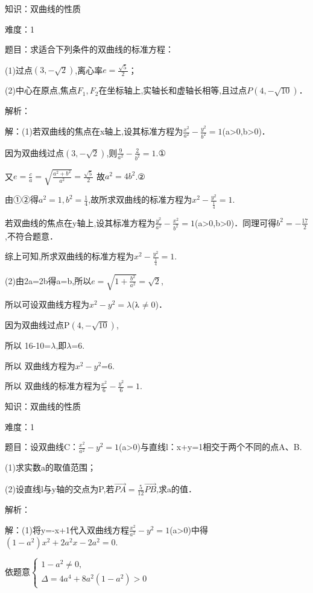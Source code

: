 \documentclass{article} %
\begin{document}
知识：双曲线的性质

难度：1

题目：求适合下列条件的双曲线的标准方程：

(1)过点$(3,-\sqrt{2})$,离心率$e=\frac{\sqrt{5}}{2}$；

(2)中心在原点,焦点$F_{1},F_{2}$在坐标轴上,实轴长和虚轴长相等,且过点$P(4,-\sqrt{10})$．

解析：

解：(1)若双曲线的焦点在x轴上,设其标准方程为$\frac{x^2}{a^2}-\frac{y^2}{b^2}=1$(a>0,b>0)．

因为双曲线过点$(3,-\sqrt{2})$,则$\frac{9}{a^2}-\frac{2}{b^2}=1$.①

又$e=\frac{c}{a}=\sqrt{\frac{a^2+b^2}{a^2}}=\frac{\sqrt{5}}{2}$ 故$a^{2}=4b^{2}$.②

由①②得$a^{2}=1,b^{2}=\frac{1}{4}$,故所求双曲线的标准方程为$x^{2}-\frac{y^2}{\frac{1}{4}}=1$.

若双曲线的焦点在y轴上,设其标准方程为$\frac{y^2}{a^2}-\frac{x^2}{b^2}=1$(a>0,b>0)．同理可得$b^{2}=-\frac{17}{2}$,不符合题意．

综上可知,所求双曲线的标准方程为$x^{2}-\frac{y^2}{\frac{1}{4}}=1$.

(2)由2a=2b得a=b,所以$e=\sqrt{1+\frac{b^2}{a^2}}=\sqrt{2}$,

所以可设双曲线方程为$x^{2}-y^{2}=\lambda$($\lambdaup$${\neq}$0)．

因为双曲线过点P$(4,-\sqrt{10})$,

所以 16-10=$\lambda$,即$\lambda$=6.

所以 双曲线方程为$x^{2}-y^{2}$=6.

所以 双曲线的标准方程为$\frac{x^2}{6}-\frac{y^2}{6}=1$.

知识：双曲线的性质

难度：1

题目：设双曲线C：$\frac{x^2}{a^2}-y^{2}=1$(a>0)与直线l：x+y=1相交于两个不同的点A、B.

(1)求实数a的取值范围；

(2)设直线l与y轴的交点为P,若$\overrightarrow{PA}=\frac{5}{12}\overrightarrow{PB}$,求a的值．

解析：

解：(1)将y=-x+1代入双曲线方程$\frac{x^2}{a^2}-y^{2}=1$(a>0)中得$(1-a^{2})x^{2}+2a^{2}x-2a^{2}=0$.

依题意$\left\{
\begin{array}{l}
1-a^2\ne 0, \\
\Delta = 4a^4+8a^2(1-a^2)>0
\end{array}
\right.$
\end{document}

